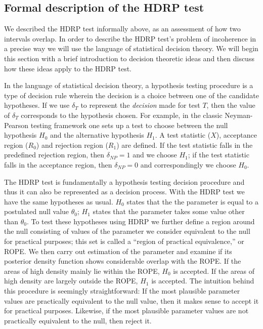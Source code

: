 \documentclass[man]{apa}
\newcommand{\hdr}{HDRP}
\begin{document}
    \subsection*{Formal description of the \hdr{} test}

We described the \hdr{} test informally above, as an assessment of how two intervals overlap. In order to describe the \hdr{} test's problem of incoherence in a precise way we will use the language of statistical decision theory. %
We will begin this section with a brief introduction to decision theoretic ideas and then discuss how these ideas apply to the \hdr{} test.
 
In the language of statistical decision theory, a hypothesis testing procedure is a type of decision rule wherein the decision is a choice between one of the candidate hypotheses. If we use $\delta_T$ to represent the \textit{decision} made for test $T$, then the value of $\delta_T$ corresponds to the hypothesis chosen. For example, in the classic Neyman-Pearson testing framework one sets up a test to choose between the null hypothesis $H_0$ and the alternative hypothesis $H_1$. A test statistic ($X$), acceptance region ($R_0$) and rejection region ($R_1$) are defined. If the test statistic falls in the predefined rejection region, then $\delta_{NP}=1$ and we choose $H_1$; if the test statistic falls in the acceptance region, then $\delta_{NP}=0$ and correspondingly we choose $H_0$.%



The \hdr{} test is fundamentally a hypothesis testing decision procedure and thus it can also be represented as a decision process. With the \hdr{} test we have the same hypotheses as usual. $H_0$ states that the the parameter is equal to a postulated null value $\theta_0$; $H_1$ states that the parameter takes some value other than $\theta_0$. To test these hypotheses using \hdr{} we further define a region around the null consisting of values of the parameter we consider equivalent to the null for practical purposes; this set is called a ``region of practical equivalence,'' or ROPE. We then carry out estimation of the parameter and examine if its posterior density function shows considerable overlap with the ROPE. If the areas of high density mainly lie within the ROPE, $H_0$ is accepted. If the areas of high density are largely outside the ROPE, $H_1$ is accepted. The intuition behind this procedure is seemingly straightforward: If the most plausible parameter values are practically equivalent to the null value, then it makes sense to accept it for practical purposes. Likewise, if the most plausible parameter values are not practically equivalent to the null, then reject it.
\end{document}
